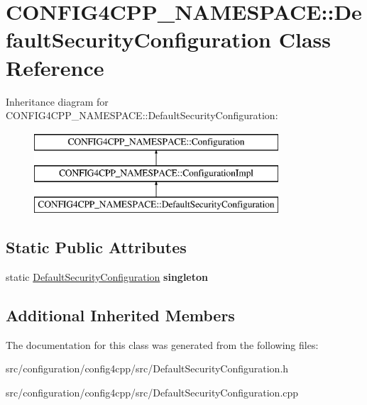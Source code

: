 \hypertarget{classCONFIG4CPP__NAMESPACE_1_1DefaultSecurityConfiguration}{\section{C\-O\-N\-F\-I\-G4\-C\-P\-P\-\_\-\-N\-A\-M\-E\-S\-P\-A\-C\-E\-:\-:Default\-Security\-Configuration Class Reference}
\label{classCONFIG4CPP__NAMESPACE_1_1DefaultSecurityConfiguration}
}
Inheritance diagram for C\-O\-N\-F\-I\-G4\-C\-P\-P\-\_\-\-N\-A\-M\-E\-S\-P\-A\-C\-E\-:\-:Default\-Security\-Configuration\-:\begin{figure}[H]
\begin{center}
\leavevmode
\includegraphics[height=3.000000cm]{classCONFIG4CPP__NAMESPACE_1_1DefaultSecurityConfiguration}
\end{center}
\end{figure}
\subsection*{Static Public Attributes}
\begin{DoxyCompactItemize}
\item 
\hypertarget{classCONFIG4CPP__NAMESPACE_1_1DefaultSecurityConfiguration_a5202578aba39793f8f040c9f9c8f0f69}{static \hyperlink{classCONFIG4CPP__NAMESPACE_1_1DefaultSecurityConfiguration}{Default\-Security\-Configuration} {\bfseries singleton}}\label{classCONFIG4CPP__NAMESPACE_1_1DefaultSecurityConfiguration_a5202578aba39793f8f040c9f9c8f0f69}

\end{DoxyCompactItemize}
\subsection*{Additional Inherited Members}


The documentation for this class was generated from the following files\-:\begin{DoxyCompactItemize}
\item 
src/configuration/config4cpp/src/Default\-Security\-Configuration.\-h\item 
src/configuration/config4cpp/src/Default\-Security\-Configuration.\-cpp\end{DoxyCompactItemize}
